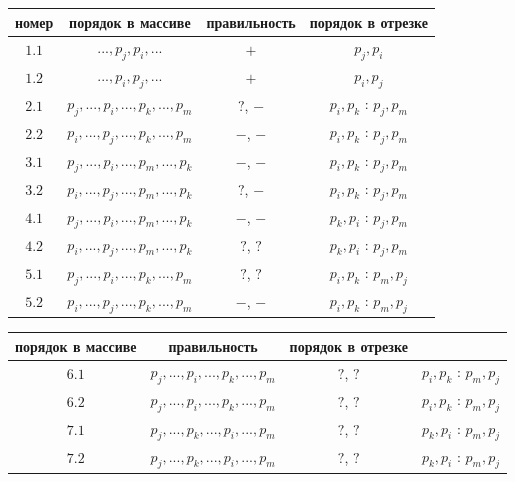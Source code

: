 \documentclass[letterpaper,12pt]{article}
\begin{document}
\begin{center}
      \begin{tabular}{| c | c | c | c |}
            \hline
            номер & порядок в массиве & 
            правильность & порядок в отрезке \\
            \hline
            $1.1$ &
            $..., p_j, p_i, ...$ & $+$ & $p_j, p_i$ \\
            \hline
            $1.2$ &
            $..., p_i, p_j, ...$ & $+$ & $p_i, p_j$ \\
            \hline
            $2.1$ &
            $p_j, ..., p_i, ..., p_k, ..., p_m$ & 
            $?$, $-$ & $p_i, p_k$ : $p_j, p_m$ \\
            \hline
            $2.2$ &
            $p_i, ..., p_j, ..., p_k, ..., p_m$ & 
            $-$, $-$ & $p_i, p_k$ : $p_j, p_m$ \\
            \hline
            $3.1$ &
            $p_j, ..., p_i, ..., p_m, ..., p_k$ & 
            $-$, $-$ & $p_i, p_k$ : $p_j, p_m$ \\
            \hline
            $3.2$ &
            $p_i, ..., p_j, ..., p_m, ..., p_k$ & 
            $?$, $-$ & $p_i, p_k$ : $p_j, p_m$ \\
            \hline
            $4.1$ &
            $p_j, ..., p_i, ..., p_m, ..., p_k$ & 
            $-$, $-$ & $p_k, p_i$ : $p_j, p_m$ \\
            \hline
            $4.2$ &
            $p_i, ..., p_j, ..., p_m, ..., p_k$ & 
            $?$, $?$ & $p_k, p_i$ : $p_j, p_m$ \\
            \hline
            $5.1$ &
            $p_j, ..., p_i, ..., p_k, ..., p_m$ & 
            $?$, $?$ & $p_i, p_k$ : $p_m, p_j$ \\
            \hline
            $5.2$ &
            $p_i, ..., p_j, ..., p_k, ..., p_m$ & 
            $-$, $-$ & $p_i, p_k$ : $p_m, p_j$ \\
            \hline    
      \end{tabular}
\end{center}

\begin{center}
      \begin{tabular}{| c | c | c | c |}
            \hline
            порядок в массиве & правильность &
            порядок в отрезке \\
            \hline
            $6.1$ &
            $p_j, ..., p_i, ..., p_k, ..., p_m$ &
            $?$, $?$ & $p_i, p_k$ : $p_m, p_j$ \\
            \hline
            $6.2$ &
            $p_j, ..., p_i, ..., p_k, ..., p_m$ &
            $?$, $?$ & $p_i, p_k$ : $p_m, p_j$ \\
            \hline
            $7.1$ &
            $p_j, ..., p_k, ..., p_i, ..., p_m$ &
            $?$, $?$ & $p_k, p_i$ : $p_m, p_j$ \\
            \hline
            $7.2$ &
            $p_j, ..., p_k, ..., p_i, ..., p_m$ &
            $?$, $?$ & $p_k, p_i$ : $p_m, p_j$ \\
            \hline
      \end{tabular}
\end{center}
\end{document}
